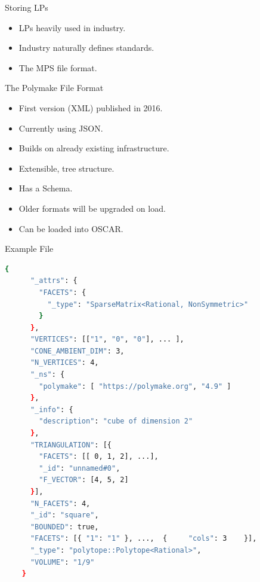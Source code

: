 \documentclass[9pt]{beamer}
\theoremstyle{definition}
\begin{document}
\begin{frame}[fragile]{ Storing LPs}
  \begin{itemize}
  \item LPs heavily used in industry. \pause
  \item Industry naturally defines standards. \pause
  \item The MPS file format. \pause
  \end{itemize}
\end{frame}


\begin{frame}[fragile]{The Polymake File Format}
  \begin{itemize}
  \item First version (XML) published in 2016. \pause
  \item Currently using JSON.\pause
  \item Builds on already existing infrastructure. \pause
  \item Extensible, tree structure. \pause
  \item Has a Schema. \pause
  \item Older formats will be upgraded on load. \pause
  \item Can be loaded into OSCAR. \pause
  \end{itemize}
\end{frame}


\begin{frame}[fragile]{Example File}
  \begin{lstlisting}[language=bash, basicstyle=\tiny]
    {
      "_attrs": {
        "FACETS": {
          "_type": "SparseMatrix<Rational, NonSymmetric>"
        }
      },
      "VERTICES": [["1", "0", "0"], ... ],
      "CONE_AMBIENT_DIM": 3,
      "N_VERTICES": 4,
      "_ns": {
        "polymake": [ "https://polymake.org", "4.9" ]
      },
      "_info": {
        "description": "cube of dimension 2"
      },
      "TRIANGULATION": [{
        "FACETS": [[ 0, 1, 2], ...],
        "_id": "unnamed#0",
        "F_VECTOR": [4, 5, 2]
      }],
      "N_FACETS": 4,
      "_id": "square",
      "BOUNDED": true,
      "FACETS": [{ "1": "1" }, ...,  {     "cols": 3    }],
      "_type": "polytope::Polytope<Rational>",
      "VOLUME": "1/9"
    }
  \end{lstlisting}
\end{frame}
\end{document}

